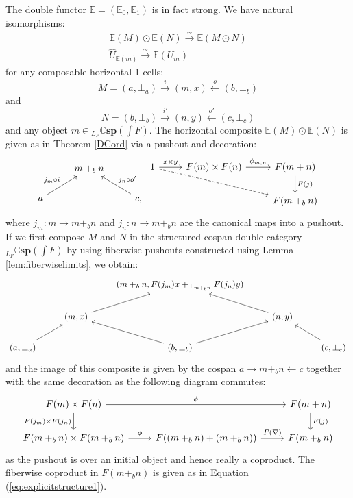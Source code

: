 \documentclass[oneside,final]{ucr}
\theoremstyle{definition}
\begin{document}
{The double functor $\mathbb{E}=(\mathbb{E}_0,\mathbb{E}_1)$ is in fact strong. We have natural isomorphisms:
\begin{gather*}
 \mathbb{E}(M) \odot \mathbb{E}(N) \xrightarrow{\sim} \mathbb{E}(M \odot N) \\
\hat{U}_{\mathbb{E}(m)} \xrightarrow{\sim} \mathbb{E}(U_m)
\end{gather*}
for any composable horizontal 1-cells: $$M = (a,\bot_a) \xrightarrow{i} (m,x) \xleftarrow{o} (b,\bot_b)$$ and $$N = (b,\bot_b) \xrightarrow{i'} (n,y) \xleftarrow{o'} (c,\bot_c)$$ and any object $m \in {_{L_F} \mathbb{C}\mathbf{sp}}(\int F)$. The horizontal composite $\mathbb{E}(M) \odot \mathbb{E}(N)$ is given as in Theorem \ref{DCord} via a pushout and decoration:
\begin{displaymath}
 \begin{tikzcd}
  & m+_bn & \\
  a\ar[ur,"j_m\circ i"] && c,\ar[ul,"j_n\circ o'"']
 \end{tikzcd}
 \begin{tikzcd}
  1\ar[r,"x\times y"]\ar[drr,dashed] & F(m)\times F(n)\ar[r,"\phi_{m,n}"] & F(m+ n)\ar[d,"F(j)"] \\ 
  && F(m+_b n)
 \end{tikzcd}
\end{displaymath}
where $j_m \colon m \to m+_b n$ and $j_n \colon n \to m+_b n$ are the canonical maps into a pushout. If we first compose $M$ and $N$ in the structured cospan double category $_{L_F} \mathbb{C}\mathbf{sp}(\int F)$ by using fiberwise pushouts constructed using Lemma \ref{lem:fiberwiselimits}, we obtain:
\begin{displaymath}
 \begin{tikzcd}
 && (m+_b n,F(j_m)x+_{\bot_{m+_bn}}F(j_n)y) && \\
 & (m,x) \ar[ur] && (n,y)\ar[ul] \\
 (a,\bot_a)\ar[ur] && (b,\bot_b)\ar[ur]\ar[ul] && (c,\bot_c)\ar[ul]
 \end{tikzcd}
\end{displaymath}
and the image of this composite is given by the cospan $a \xrightarrow{} m+_b n \xleftarrow{} c$ together with the same decoration as the following diagram commutes:
\begin{displaymath}
 \begin{tikzcd}
F(m)\times F(n)\ar[rr,"\phi"]\ar[d,"F(j_m)\times F(j_n)"'] && F(m+n)\ar[d,"F(j)"] \\
F(m+_bn)\times F(m+_bn)\ar[r,"\phi"] & F((m+_bn)+(m+_bn))\ar[r,"F(\nabla)"] & F(m+_bn)
 \end{tikzcd}
\end{displaymath}
as the pushout is over an initial object and hence really a coproduct. The fiberwise coproduct in $F(m+_b n)$ is given as in Equation (\ref{eq:explicitstructure1}).

}
\end{document}
